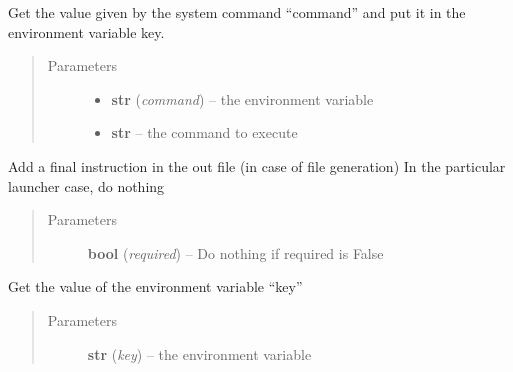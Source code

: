 \documentclass[a4paper,10pt,english]{sphinxmanual}
\begin{document}
\begin{fulllineitems}
\begin{fulllineitems}
\label{commands/apidoc/src:src.fileEnviron.LauncherFileEnviron.command_value}
Get the value given by the system command ``command'' 
and put it in the environment variable key.
\begin{quote}\begin{description}
\item[{Parameters}] \leavevmode\begin{itemize}
\item {} 
\textbf{str} (\emph{command}) -- the environment variable

\item {} 
\textbf{str} -- the command to execute

\end{itemize}

\end{description}\end{quote}

\end{fulllineitems}


\begin{fulllineitems}
\label{commands/apidoc/src:src.fileEnviron.LauncherFileEnviron.finish}
Add a final instruction in the out file (in case of file generation)
In the particular launcher case, do nothing
\begin{quote}\begin{description}
\item[{Parameters}] \leavevmode
\textbf{bool} (\emph{required}) -- Do nothing if required is False

\end{description}\end{quote}

\end{fulllineitems}


\begin{fulllineitems}
\label{commands/apidoc/src:src.fileEnviron.LauncherFileEnviron.get}
Get the value of the environment variable ``key''
\begin{quote}\begin{description}
\item[{Parameters}] \leavevmode
\textbf{str} (\emph{key}) -- the environment variable


\end{description}
\end{quote}
\end{fulllineitems}
\end{fulllineitems}
\end{document}
